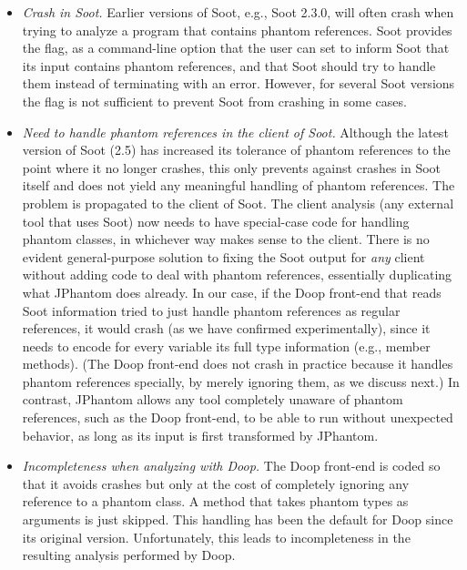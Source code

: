 \begin{itemize}
\item \emph{Crash in Soot.} Earlier versions of Soot, e.g.,
  Soot 2.3.0, will often crash when trying to analyze a program that
  contains phantom references.
  Soot provides the  flag, as a command-line
  option that the user can set to inform Soot that its input contains
  phantom references, and that Soot should try to handle them instead
  of terminating with an error. However, for several Soot versions the
  flag is not sufficient to prevent Soot from crashing in some cases.

\item \emph{Need to handle phantom references in the client of
  Soot.} Although the latest version of Soot (2.5) has increased its
  tolerance of phantom references to the point where it no longer
  crashes, this only prevents against crashes in Soot itself and does
  not yield any meaningful handling of phantom references.  The
  problem is propagated to the client of Soot. The client analysis
  (any external tool that uses Soot) now needs to have special-case
  code for handling phantom classes, in whichever way makes sense to
  the client. There is no evident general-purpose solution to fixing
  the Soot output for \emph{any} client without adding code to deal
  with phantom references, essentially duplicating what JPhantom does
  already. In our case, if the Doop front-end that reads Soot
  information tried to just handle phantom references as regular
  references, it would crash (as we have confirmed experimentally),
  since it needs to encode for every variable its full type
  information (e.g., member methods).  (The Doop front-end does not
  crash in practice because it handles phantom references specially,
  by merely ignoring them, as we discuss next.) In contrast, JPhantom
  allows any tool completely unaware of phantom references, such as
  the Doop front-end, to be able to run without unexpected behavior,
  as long as its input is first transformed by JPhantom.

\item \emph{Incompleteness when analyzing with Doop.} The Doop
  front-end is coded so that it avoids crashes but only at the
  cost of completely ignoring any reference to a phantom class. A
  method that takes phantom types as arguments is just skipped. This
  handling has been the default for Doop since its original version.
  Unfortunately, this leads to incompleteness in the resulting
  analysis performed by Doop.


\end{itemize}
